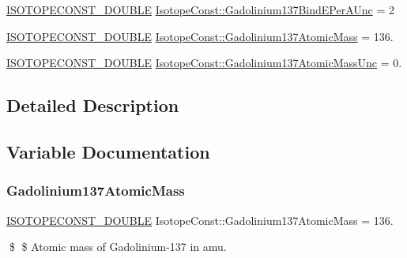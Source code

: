 \begin{DoxyCompactItemize}
\mbox{\hyperlink{group___isotope_const-_macros_ga8f45a7272ce02c0b4c65c44636ed719a}{I\+S\+O\+T\+O\+P\+E\+C\+O\+N\+S\+T\+\_\+\+D\+O\+U\+B\+LE}} \mbox{\hyperlink{group___isotope_const-_gadolinium-_gd137_ga1e1f3756323b9e6ed6eedc8a9b21fdfa}{Isotope\+Const\+::\+Gadolinium137\+Bind\+E\+Per\+A\+Unc}} = 2
\item 
\mbox{\hyperlink{group___isotope_const-_macros_ga8f45a7272ce02c0b4c65c44636ed719a}{I\+S\+O\+T\+O\+P\+E\+C\+O\+N\+S\+T\+\_\+\+D\+O\+U\+B\+LE}} \mbox{\hyperlink{group___isotope_const-_gadolinium-_gd137_ga029f78e019d854262222957471d190c1}{Isotope\+Const\+::\+Gadolinium137\+Atomic\+Mass}} = 136.
\item 
\mbox{\hyperlink{group___isotope_const-_macros_ga8f45a7272ce02c0b4c65c44636ed719a}{I\+S\+O\+T\+O\+P\+E\+C\+O\+N\+S\+T\+\_\+\+D\+O\+U\+B\+LE}} \mbox{\hyperlink{group___isotope_const-_gadolinium-_gd137_gac82b706e810c179f8beea989bafa62e5}{Isotope\+Const\+::\+Gadolinium137\+Atomic\+Mass\+Unc}} = 0.
\end{DoxyCompactItemize}


\subsection{Detailed Description}


\subsection{Variable Documentation}
\mbox{\label{group___isotope_const-_gadolinium-_gd137_ga029f78e019d854262222957471d190c1}} 
\subsubsection{\texorpdfstring{Gadolinium137\+Atomic\+Mass}{Gadolinium137AtomicMass}}
{\footnotesize\ttfamily \mbox{\hyperlink{group___isotope_const-_macros_ga8f45a7272ce02c0b4c65c44636ed719a}{I\+S\+O\+T\+O\+P\+E\+C\+O\+N\+S\+T\+\_\+\+D\+O\+U\+B\+LE}} Isotope\+Const\+::\+Gadolinium137\+Atomic\+Mass = 136.}

\$ \$ Atomic mass of Gadolinium-\/137 in amu. \mbox{\label{group___isotope_const-_gadolinium-_gd137_gac82b706e810c179f8beea989bafa62e5}} 
